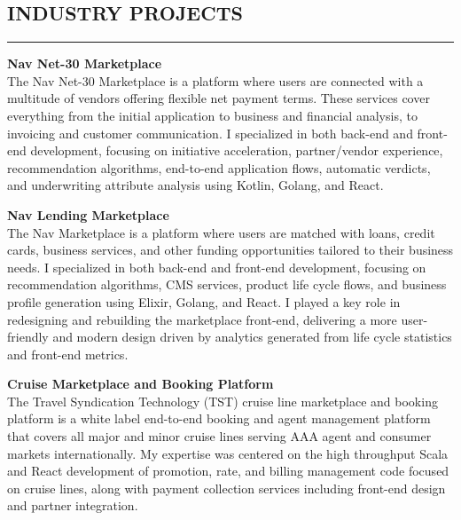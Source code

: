 \documentclass{res}
\begin{document}
\begin{resume}
		\section{{INDUSTRY PROJECTS}}
    \noindent\rule[0.5ex]{\linewidth}{1pt}        
        {\bf Nav Net-30 Marketplace} \hfill \vspace{5pt} \\
           The Nav Net-30 Marketplace is a platform where users are connected with a multitude of vendors offering flexible net payment terms. These services cover everything from the initial application to business and financial analysis, to invoicing and customer communication. I specialized in both back-end and front-end development, focusing on initiative acceleration, partner/vendor experience, recommendation algorithms, end-to-end application flows, automatic verdicts, and underwriting attribute analysis using Kotlin, Golang, and React.

\vspace{-5pt}
        
        {\bf Nav Lending Marketplace} \hfill \vspace{5pt} \\
           The Nav Marketplace is a platform where users are matched with loans, credit cards, business services, and other funding opportunities tailored to their business needs. I specialized in both back-end and front-end development, focusing on recommendation algorithms, CMS services, product life cycle flows, and business profile generation using Elixir, Golang, and React. I played a key role in redesigning and rebuilding the marketplace front-end, delivering a more user-friendly and modern design driven by analytics generated from life cycle statistics and front-end metrics.

\vspace{-5pt}

        {\bf Cruise Marketplace and Booking Platform} \hfill \vspace{5pt} \\
           The Travel Syndication Technology (TST) cruise line marketplace and booking platform is a white label end-to-end booking and agent management platform that covers all major and minor cruise lines serving AAA agent and consumer markets internationally. My expertise was centered on the high throughput Scala and React development of promotion, rate, and billing management code focused on cruise lines, along with payment collection services including front-end design and partner integration.


\end{resume}
\end{document}
